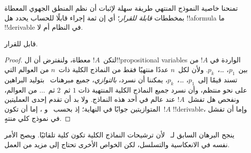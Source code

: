 \documentclass[../../../include/open-logic-section]{subfiles}
\begin{document}

تمنحنا خاصية النموذج المنتهي طريقة سهلة لإثبات أن نظم المنطق الجهوي المعطاة
بمخططات \emph{قابلة للقرار}؛ أي إن ثمة إجراء قابلًا للحساب يحدد هل
!!a{formula} ما !!{derivable} في النظام أم لا.

\begin{thm}
   قابل للقرار.
\end{thm}

\begin{proof}
  لتكن~$!A$ معطاة، ولنفترض أن ال!!{propositional variable}s الواردة في
  $!A$ من بين~$p_1$، \dots،~$p_k$. ولأن لكل~$n$ عددًا منتهيًا فقط من
  النماذج الكلية ذات~$n$ من العوالم التي تسند قيمًا إلى~$p_1$،
  \dots،~$p_k$، يمكننا أن نسرد، \emph{بالتوازي}، جميع مبرهنات~
  بتوليد البراهين على نحو منتظم، وأن نسرد جميع النماذج الكلية المنتهية ذات
  $1$ ثم~$2$ ثم~$\dots$ من العوالم، ونفحص هل تفشل~$!A$ عند عالم في
  أحد هذه النماذج. ولا بد أن تقدم إحدى العمليتين المتوازيتين جوابًا في
  النهاية؛ إذ بحسب~ و
  ، إما أن تكون~$!A$ !!{derivable}، وإما أن تفشل
  في نموذج كلي منتهٍ.
\end{proof}

ينجح البرهان السابق لـ~ لأن ترشيحات النماذج الكلية تكون كلية
تلقائيًا. ويصح الأمر نفسه في الانعكاسية والتسلسل، لكن الخواص الأخرى تحتاج
إلى مزيد من العمل.
\end{document}
